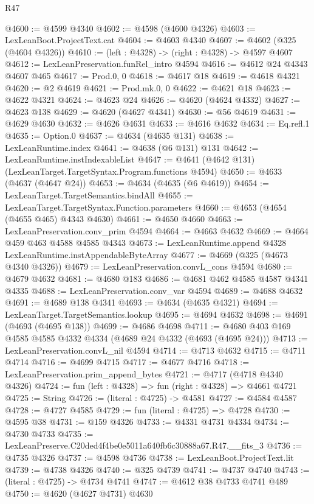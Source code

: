 \begin{lexlean}{R47}
\begin{coremodule}
@4600 := @4599 @4340
@4602 := @4598 (@4600 @4326)
@4603 := LexLeanBoot.ProjectText.cat
@4604 := @4603 @4340
@4607 := @4602 (@325 (@4604 @4326))
@4610 := (left : @4328) -> (right : @4328) -> @4597 @4607
@4612 := LexLeanPreservation.funRel_intro @4594
@4616 := @4612 @24 @4343 @4607 @465
@4617 := Prod.{0, 0}
@4618 := @4617 @18
@4619 := @4618 @4321
@4620 := @2 @4619
@4621 := Prod.mk.{0, 0}
@4622 := @4621 @18
@4623 := @4622 @4321
@4624 := @4623 @24
@4626 := @4620 (@4624 @4332)
@4627 := @4623 @138
@4629 := @4620 (@4627 @4341)
@4630 := @56 @4619
@4631 := @4629 @4630
@4632 := @4626 @4631
@4633 := @4616 @4632
@4634 := Eq.refl.{1}
@4635 := Option.{0}
@4637 := @4634 (@4635 @131)
@4638 := LexLeanRuntime.index
@4641 := @4638 (@6 @131) @131
@4642 := LexLeanRuntime.instIndexableList
@4647 := @4641 (@4642 @131) (LexLeanTarget.TargetSyntax.Program.functions @4594)
@4650 := @4633 (@4637 (@4647 @24))
@4653 := @4634 (@4635 (@6 @4619))
@4654 := LexLeanTarget.TargetSemantics.bindAll
@4655 := LexLeanTarget.TargetSyntax.Function.parameters
@4660 := @4653 (@4654 (@4655 @465) @4343 @4630)
@4661 := @4650 @4660
@4663 := LexLeanPreservation.conv_prim @4594
@4664 := @4663 @4632
@4669 := @4664 @459 @463 @4588 @4585 @4343
@4673 := LexLeanRuntime.append @4328 LexLeanRuntime.instAppendableByteArray
@4677 := @4669 (@325 (@4673 @4340 @4326))
@4679 := LexLeanPreservation.convL_cons @4594
@4680 := @4679 @4632
@4681 := @4680 @183
@4686 := @4681 @462 @4585 @4587 @4341 @4335
@4688 := LexLeanPreservation.conv_var @4594
@4689 := @4688 @4632
@4691 := @4689 @138 @4341
@4693 := @4634 (@4635 @4321)
@4694 := LexLeanTarget.TargetSemantics.lookup
@4695 := @4694 @4632
@4698 := @4691 (@4693 (@4695 @138))
@4699 := @4686 @4698
@4711 := @4680 @403 @169 @4585 @4585 @4332 @4334 (@4689 @24 @4332 (@4693 (@4695 @24)))
@4713 := LexLeanPreservation.convL_nil @4594
@4714 := @4713 @4632
@4715 := @4711 @4714
@4716 := @4699 @4715
@4717 := @4677 @4716
@4718 := LexLeanPreservation.prim_append_bytes
@4721 := @4717 (@4718 @4340 @4326)
@4724 := fun (left : @4328) => fun (right : @4328) => @4661 @4721
@4725 := String
@4726 := (literal : @4725) -> @4581
@4727 := @4584 @4587
@4728 := @4727 @4585
@4729 := fun (literal : @4725) => @4728
@4730 := @4595 @38
@4731 := @159 @4326
@4733 := @4331 @4731 @4334
@4734 := @4730 @4733
@4735 := LexLeanPreserve.C20ded4f4be0e5011a640fb6c30888a67.R47.__fits_3
@4736 := @4735 @4326
@4737 := @4598 @4736
@4738 := LexLeanBoot.ProjectText.lit
@4739 := @4738 @4326
@4740 := @325 @4739
@4741 := @4737 @4740
@4743 := (literal : @4725) -> @4734 @4741
@4747 := @4612 @38 @4733 @4741 @489
@4750 := @4620 (@4627 @4731) @4630

\end{coremodule}
\end{lexlean}
